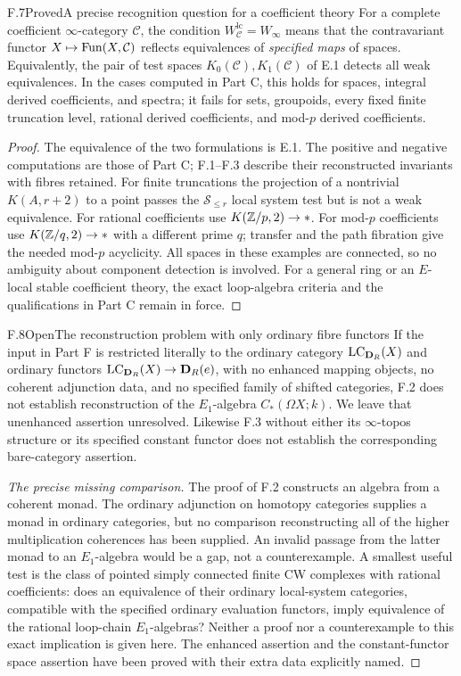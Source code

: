 \begin{claim}{F.7}{Proved}{A precise recognition question for a coefficient theory}
For a complete coefficient $\infty$-category $\mathcal C$,
the condition $W_{\mathcal C}^{\mathrm{lc}}=W_\infty$ means
that the contravariant functor
$X\mapsto\operatorname{Fun}(X,\mathcal C)$ reflects equivalences of
\emph{specified maps} of spaces.  Equivalently, the pair of
test spaces $K_0(\mathcal C),K_1(\mathcal C)$ of E.1 detects
all weak equivalences.  In the cases computed in Part C, this
holds for spaces, integral derived coefficients, and spectra;
it fails for sets, groupoids, every fixed finite truncation level,
rational derived coefficients, and mod-$p$ derived coefficients.
\end{claim}
\begin{proof}
The equivalence of the two formulations is E.1.  The positive
and negative computations are those of Part C; F.1--F.3
describe their reconstructed invariants with fibres retained.
For finite truncations the projection of a nontrivial
$K(A,r+2)$ to a point passes the $\mathcal S_{\le r}$ local
system test but is not a weak equivalence.  For rational
coefficients use $K(\mathbb Z/p,2)\to *$.  For mod-$p$ coefficients
use $K(\mathbb Z/q,2)\to *$ with a different prime $q$; transfer
and the path fibration give the needed mod-$p$ acyclicity.
All spaces in these examples are connected, so no ambiguity
about component detection is involved.  For a general ring
or an $E$-local stable coefficient theory, the exact loop-algebra
criteria and the qualifications in Part C remain in force.
\end{proof}

\begin{claim}{F.8}{Open}{The reconstruction problem with only ordinary fibre functors}
If the input in Part F is restricted literally to the ordinary
category $\operatorname{LC}_{\mathbf D_R}(X)$ and ordinary functors
$\operatorname{LC}_{\mathbf D_R}(X)\to\mathbf D_R(e)$, with no enhanced mapping objects,
no coherent adjunction data, and no specified family of shifted
categories, F.2 does not establish reconstruction of the
$E_1$-algebra $C_*(\Omega X;k)$.  We leave that unenhanced
assertion unresolved.  Likewise F.3 without either its
$\infty$-topos structure or its specified constant functor
does not establish the corresponding bare-category assertion.
\end{claim}
\begin{proof}[The precise missing comparison]
The proof of F.2 constructs an algebra from a coherent monad.
The ordinary adjunction on homotopy categories supplies a
monad in ordinary categories, but no comparison reconstructing
all of the higher multiplication coherences has been supplied.
An invalid passage from the latter monad to an $E_1$-algebra
would be a gap, not a counterexample.  A smallest useful
test is the class of pointed simply connected finite CW
complexes with rational coefficients: does an equivalence
of their ordinary local-system categories, compatible with
the specified ordinary evaluation functors, imply equivalence
of the rational loop-chain $E_1$-algebras?  Neither a proof
nor a counterexample to this exact implication is given here.
The enhanced assertion and the constant-functor space assertion
have been proved with their extra data explicitly named.
\end{proof}
